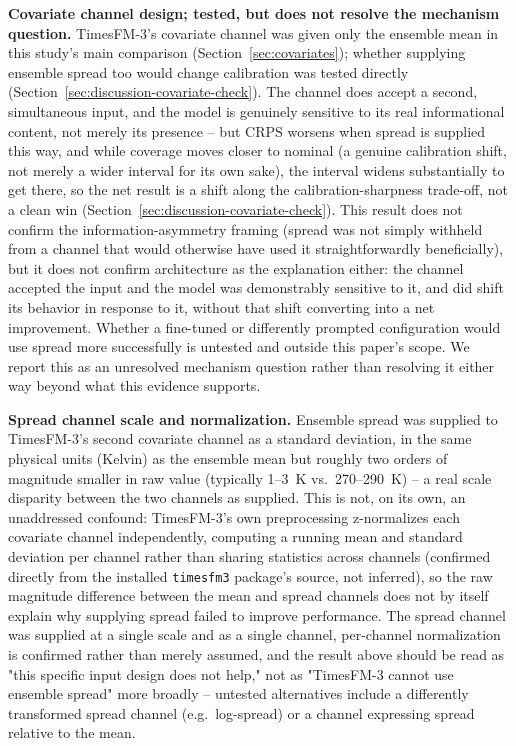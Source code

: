 \textbf{Covariate channel design; tested, but does not resolve the
mechanism question.} TimesFM-3's covariate channel was given only the
ensemble mean in this study's main comparison
(Section~\ref{sec:covariates}); whether supplying ensemble spread too
would change calibration was tested directly
(Section~\ref{sec:discussion-covariate-check}). The channel does accept
a second, simultaneous input, and the model is genuinely sensitive to
its real informational content, not merely its presence -- but CRPS
worsens when spread is supplied this way, and while coverage moves
closer to nominal (a genuine calibration shift, not merely a wider
interval for its own sake), the interval widens substantially to get
there, so the net result is a shift along the calibration-sharpness
trade-off, not a clean win (Section~\ref{sec:discussion-covariate-check}).
This result does not confirm the information-asymmetry framing (spread
was not simply withheld from a channel that would otherwise have used it
straightforwardly beneficially), but it does not confirm architecture as
the explanation either: the channel accepted the input and the model was
demonstrably sensitive to it, and did shift its behavior in response to
it, without that shift converting into a net improvement. Whether a
fine-tuned or differently prompted configuration would use spread more
successfully is untested and outside this paper's scope. We report this
as an unresolved mechanism question rather than resolving it either way
beyond what this evidence supports.

\textbf{Spread channel scale and normalization.} Ensemble spread was
supplied to TimesFM-3's second covariate channel as a standard
deviation, in the same physical units (Kelvin) as the ensemble mean but
roughly two orders of magnitude smaller in raw value (typically 1--3~K
vs.\ 270--290~K) -- a real scale disparity between the two channels as
supplied. This is not, on its own, an unaddressed confound: TimesFM-3's
own preprocessing z-normalizes each covariate channel independently,
computing a running mean and standard deviation per channel rather than
sharing statistics across channels (confirmed directly from the
installed \texttt{timesfm3} package's source, not inferred), so the raw
magnitude difference between the mean and spread channels does not by
itself explain why supplying spread failed to improve performance. The
spread channel was supplied at a single scale and as a single channel,
per-channel normalization is confirmed rather than merely assumed, and
the result above should be read as "this specific input design does not
help," not as "TimesFM-3 cannot use ensemble spread" more broadly --
untested alternatives include a differently transformed spread channel
(e.g.\ log-spread) or a channel expressing spread relative to the mean.

